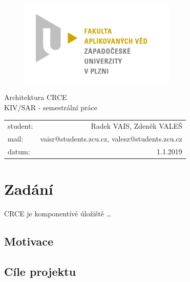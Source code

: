 \documentclass[12pt, a4paper]{article}
\begin{document}
\begin{figure}[h!]
\centering
\includegraphics[bb= 0 0 820 445 , width=75mm]{favlogo.jpg}
\end{figure}

\vspace{5cm}

{\centering
{\huge Architektura CRCE}\\[1em]
{\large KIV/SAR - semestrální práce}\\[7,5cm]
}

\begin{tabular}{l r}
student: & Radek VAIS, Zdeněk VALEŠ\\
mail: & vaisr@students.zcu.cz, valesz@students.zcu.cz\\
datum: & 1.1.2019\\
\end{tabular}

\thispagestyle{empty}
\newpage

\section{Zadání} %

CRCE je komponentívé úložiště \ldots

\subsection{Motivace}

\subsection{Cíle projektu}

\newpage
\end{document}
